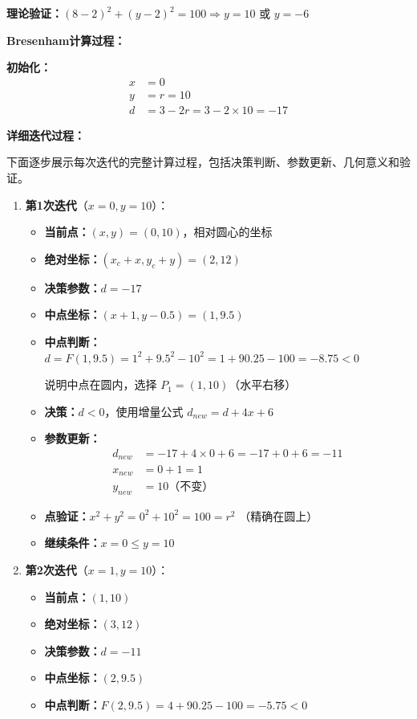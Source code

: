 ﻿\documentclass[12pt,a4paper]{article}
\begin{document}
\textbf{理论验证：}$(8-2)^2+(y-2)^2=100 \Rightarrow y=10$ 或 $y=-6$

\textbf{Bresenham计算过程：}

\textbf{初始化：}
\begin{align*}
x &= 0 \\
y &= r = 10 \\
d &= 3 - 2r = 3 - 2 \times 10 = -17
\end{align*}

\textbf{详细迭代过程：}

下面逐步展示每次迭代的完整计算过程，包括决策判断、参数更新、几何意义和验证。

\begin{enumerate}
\item \textbf{第1次迭代}（$x=0, y=10$）：
  \begin{itemize}
  \item \textbf{当前点：}$(x, y) = (0, 10)$，相对圆心的坐标
  \item \textbf{绝对坐标：}$(x_c + x, y_c + y) = (2, 12)$
  \item \textbf{决策参数：}$d = -17$
  \item \textbf{中点坐标：}$(x+1, y-0.5) = (1, 9.5)$
  \item \textbf{中点判断：}$d = F(1, 9.5) = 1^2 + 9.5^2 - 10^2 = 1 + 90.25 - 100 = -8.75 < 0$
    
    说明中点在圆内，选择 $P_1 = (1, 10)$（水平右移）
  \item \textbf{决策：}$d < 0$，使用增量公式 $d_{new} = d + 4x + 6$
  \item \textbf{参数更新：}
    \begin{align*}
    d_{new} &= -17 + 4 \times 0 + 6 = -17 + 0 + 6 = -11 \\
    x_{new} &= 0 + 1 = 1 \\
    y_{new} &= 10 \text{（不变）}
    \end{align*}
  \item \textbf{点验证：}$x^2 + y^2 = 0^2 + 10^2 = 100 = r^2$ \checkmark（精确在圆上）
  \item \textbf{继续条件：}$x = 0 \leq y = 10$ \checkmark
  \end{itemize}

\item \textbf{第2次迭代}（$x=1, y=10$）：
  \begin{itemize}
  \item \textbf{当前点：}$(1, 10)$
  \item \textbf{绝对坐标：}$(3, 12)$
  \item \textbf{决策参数：}$d = -11$
  \item \textbf{中点坐标：}$(2, 9.5)$
  \item \textbf{中点判断：}$F(2, 9.5) = 4 + 90.25 - 100 = -5.75 < 0$
    

\end{itemize}
\end{enumerate}
\end{document}
